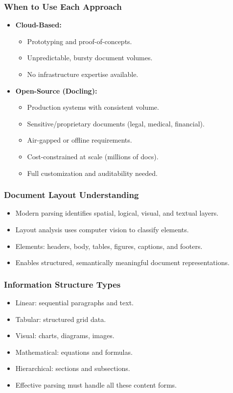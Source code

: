 \begin{frame}[fragile]\frametitle{When to Use Each Approach}
      \begin{itemize}
        \item \textbf{Cloud-Based:}
        \begin{itemize}
          \item Prototyping and proof-of-concepts.
          \item Unpredictable, bursty document volumes.
          \item No infrastructure expertise available.
        \end{itemize}
        \item \textbf{Open-Source (Docling):}
        \begin{itemize}
          \item Production systems with consistent volume.
          \item Sensitive/proprietary documents (legal, medical, financial).
          \item Air-gapped or offline requirements.
          \item Cost-constrained at scale (millions of docs).
          \item Full customization and auditability needed.
        \end{itemize}
      \end{itemize}
\end{frame}
\begin{frame}[fragile]\frametitle{Document Layout Understanding}
      \begin{itemize}
        \item Modern parsing identifies spatial, logical, visual, and textual layers.
        \item Layout analysis uses computer vision to classify elements.
        \item Elements: headers, body, tables, figures, captions, and footers.
        \item Enables structured, semantically meaningful document representations.
      \end{itemize}
\end{frame}

\begin{frame}[fragile]\frametitle{Information Structure Types}
      \begin{itemize}
        \item Linear: sequential paragraphs and text.
        \item Tabular: structured grid data.
        \item Visual: charts, diagrams, images.
        \item Mathematical: equations and formulas.
        \item Hierarchical: sections and subsections.
        \item Effective parsing must handle all these content forms.
      \end{itemize}
\end{frame}

